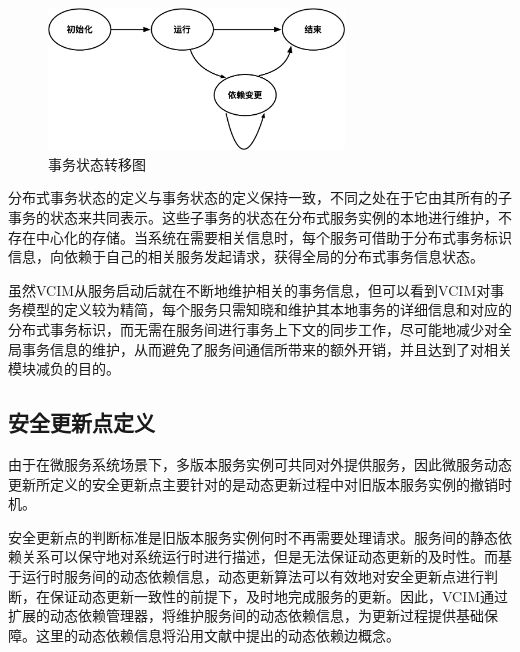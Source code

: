 \documentclass[macfonts,master]{njuthesis}
\begin{document}
\begin{figure}[!htbp]
  \centering
  \includegraphics[width= 0.7\textwidth]{image/transaction_shift.png}
  \caption{事务状态转移图}
  \label{fig:transaction_shift}
\end{figure}

分布式事务状态的定义与事务状态的定义保持一致，不同之处在于它由其所有的子事务的状态来共同表示。这些子事务的状态在分布式服务实例的本地进行维护，不存在中心化的存储。当系统在需要相关信息时，每个服务可借助于分布式事务标识信息，向依赖于自己的相关服务发起请求，获得全局的分布式事务信息状态。

虽然VCIM从服务启动后就在不断地维护相关的事务信息，但可以看到VCIM对事务模型的定义较为精简，每个服务只需知晓和维护其本地事务的详细信息和对应的分布式事务标识，而无需在服务间进行事务上下文的同步工作，尽可能地减少对全局事务信息的维护，从而避免了服务间通信所带来的额外开销，并且达到了对相关模块减负的目的。


\subsection{安全更新点定义}
由于在微服务系统场景下，多版本服务实例可共同对外提供服务，因此微服务动态更新所定义的安全更新点主要针对的是动态更新过程中对旧版本服务实例的撤销时机。

安全更新点的判断标准是旧版本服务实例何时不再需要处理请求。服务间的静态依赖关系可以保守地对系统运行时进行描述，但是无法保证动态更新的及时性。而基于运行时服务间的动态依赖信息，动态更新算法可以有效地对安全更新点进行判断，在保证动态更新一致性的前提下，及时地完成服务的更新。因此，VCIM通过扩展的动态依赖管理器，将维护服务间的动态依赖信息，为更新过程提供基础保障。这里的动态依赖信息将沿用文献\cite{ma2011version}中提出的动态依赖边概念。
\end{document}
